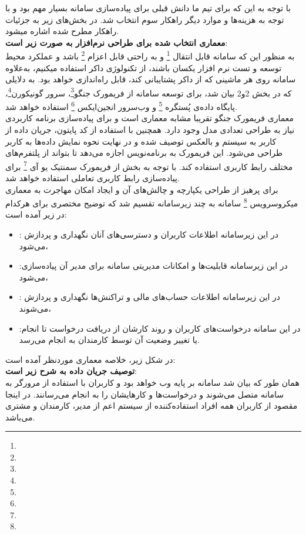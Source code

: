 \documentclass{article}
\begin{document}
با توجه به این که برای تیم ما دانش قبلی برای پیاده‌سازی سامانه بسیار مهم بود و با توجه به هزینه‌ها و موارد دیگر راهکار سوم انتخاب شد. در بخش‌های زیر به جزئیات راهکار مطرح شده اشاره میشود.\\
\textbf{معماری انتخاب شده برای طراحی نرم‌افزار به صورت زیر است}:\\
به منظور این که سامانه قابل انتقال \footnote{} و به راحتی قابل اعزام \footnote{} باشد و عملکرد محیط توسعه و تست نرم افزار یکسان باشند، از تکنولوژی داکر استفاده میکنیم، به‌علاوه سامانه روی هر ماشینی که از داکر پشتایبانی کند، قابل راه‌اندازی خواهد بود.
به دلایلی که در بخش 2و2 بیان شد، برای توسعه سامانه از فریمورک جنگو\footnote{}، سرور گونیکورن\footnote{}، پایگاه داده‌ی پُستگره \footnote{} و وب‌سرور انجین‌ایکس \footnote{} استفاده خواهد شد.\\
معماری فریمورک جنگو تقریبا مشابه معماری  است و برای پیاده‌سازی برنامه کاربردی نیاز به طراحی تعدادی مدل وجود دارد. همچنین با استفاده از کد پایتون، جریان داده از کاربر به سیستم و بالعکس توصیف شده و در نهایت نحوه نمایش داده‌ها به کاربر طراحی می‌شود. این فریمورک به برنامه‌نویس اجازه می‌دهد تا بتواند از پلتفرم‌های مختلف رابط کاربری استفاده کند. با توجه به بخش از فریمورک سمنتیک یو آی \footnote{} برای پیاده‌سازی رابط کاربری تعاملی استفاده‌ خواهد شد.\\
برای پرهیز از طراحی یکپارچه و چالش‌های آن و ایجاد امکان مهاجرت به معماری میکروسرویس \footnote{} سامانه به چند زیرسامانه تقسیم شد که توضیح مختصری برای هرکدام در زیر آمده است:
\begin{itemize}
\item
{}: در این زیرسامانه اطلاعات کاربران و دسترسی‌های آنان نگهداری و پردازش می‌شود،
\item
{}:‌در این زیرسامانه قابلیت‌ها و امکانات مدیریتی سامانه برای مدیر آن پیاده‌سازی‌ می‌شود،
\item
{}: در این زیرسامانه اطلاعات حساب‌های مالی و تراکنش‌ها نگهداری و پردازش می‌شوند،
\item
{}:‌در این سامانه درخواست‌های کاربران و روند کارشان از دریافت درخواست تا انجام یا تغییر وضعیت آن توسط کارمندان به انجام می‌رسد. 
\end{itemize}
در شکل زیر، خلاصه معماری موردنظر آمده است:\\
\textbf{توصیف جریان داده به شرح زیر است}:\\
همان‌ طور که بیان شد سامانه بر پایه وب خواهد بود و کاربران با استفاده از مرورگر به سامانه متصل می‌شوند و درخواست‌‌ها و کارهایشان را به انجام می‌رسانند. در اینجا مقصود از کاربران همه افراد استفاده‌کننده از سیستم اعم از مدیر، کارمندان و مشتری می‌باشد.\\
\end{document}
